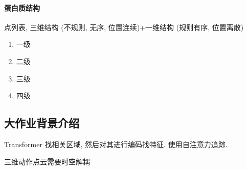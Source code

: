 \paragraph{蛋白质结构} 
点列表, 三维结构 (不规则, 无序, 位置连续)+一维结构 (规则有序, 位置离散)
\begin{enumerate}
    \item 一级
    \item 二级
    \item 三级
    \item 四级
\end{enumerate}

\subsection{大作业背景介绍}

Transformer 找相关区域, 然后对其进行编码找特征. 使用自注意力追踪. 

三维动作点云需要时空解耦


